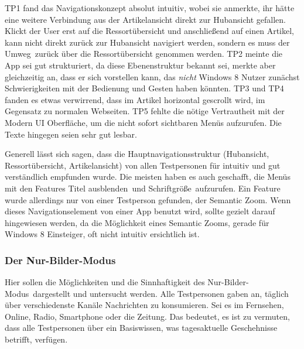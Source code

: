 \documentclass[12pt,a4paper,bibtotoc,abstracton]{scrartcl}
\begin{document}
TP1 fand das Navigationskonzept \glqq absolut intuitiv\grqq, wobei sie anmerkte, ihr hätte eine weitere Verbindung aus der Artikelansicht direkt zur Hubansicht gefallen. Klickt der User erst auf die Ressortübersicht und anschließend auf einen Artikel, kann nicht direkt zurück zur Hubansicht navigiert werden, sondern es muss der \glqq Umweg\grqq\ zurück über die Ressortübersicht genommen werden. TP2 meinte die App sei gut strukturiert, da diese Ebenenstruktur bekannt sei, merkte aber gleichzeitig an, dass er sich vorstellen kann, das \emph{nicht} Windows 8 Nutzer zunächst Schwierigkeiten mit der Bedienung und Gesten haben könnten. TP3 und TP4 fanden es etwas verwirrend, dass im Artikel horizontal gescrollt wird, im Gegensatz zu normalen Webseiten. TP5 \glqq fehlte die nötige Vertrautheit mit der Modern UI Oberfläche\grqq, um die nicht sofort sichtbaren Menüs aufzurufen. Die Texte hingegen seien sehr gut lesbar.

Generell lässt sich sagen, dass die Hauptnavigationsstruktur (Hubansicht, Ressortübersicht, Artikelansicht) von allen Testpersonen für intuitiv und gut verständlich empfunden wurde. Die meisten haben es auch geschafft, die Menüs mit den Features \glqq Titel ausblenden\grqq\ und \glqq Schriftgröße\grqq\ aufzurufen. Ein Feature wurde allerdings nur von einer Testperson gefunden, der \glqq Semantic Zoom\grqq. Wenn dieses Navigationselement von einer App benutzt wird, sollte gezielt darauf hingewiesen werden, da die Möglichkeit eines \glqq Semantic Zooms\grqq, gerade für Windows 8 Einsteiger, oft nicht intuitiv ersichtlich ist.

\subsubsection{Der Nur-Bilder-Modus}
\label{subsubsec:nurbildermodus}
Hier sollen die Möglichkeiten und die Sinnhaftigkeit des \glqq Nur-Bilder-Modus\grqq\  dargestellt und untersucht werden. Alle Testpersonen gaben an, täglich über verschiedenste Kanäle Nachrichten zu konsumieren. Sei es im Fernsehen, Online, Radio, Smartphone oder die Zeitung. Das bedeutet, es ist zu vermuten, dass alle Testpersonen über ein Basiswissen, was tagesaktuelle Geschehnisse betrifft, verfügen.
\end{document}
